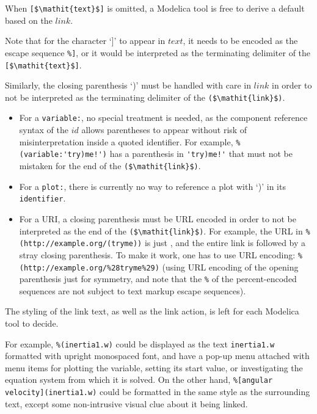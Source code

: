 When \lstinline![$\mathit{text}$]! is omitted, a Modelica tool is free to derive a default based on the $\mathit{link}$.

\begin{nonnormative}
Note that for the character `]' to appear in $\mathit{text}$, it needs to be encoded as the escape sequence \lstinline!%]!, or it would be interpreted as the terminating delimiter of the \lstinline![$\mathit{text}$]!.

Similarly, the closing parenthesis `)' must be handled with care in $\mathit{link}$ in order to not be interpreted as the terminating delimiter of the \lstinline!($\mathit{link}$)!.
\begin{itemize}
\item
For a \lstinline!variable:!, no special treatment is needed, as the component reference syntax of the $\mathit{id}$ allows parentheses to appear without risk of misinterpretation inside a quoted identifier.
For example, \lstinline"%(variable:'try)me!')" has a parenthesis in \lstinline"'try)me!'" that must not be mistaken for the end of the \lstinline!($\mathit{link}$)!.
\item
For a \lstinline!plot:!, there is currently no way to reference a plot with `)' in its \lstinline!identifier!.
\item
For a URI, a closing parenthesis must be URL encoded in order to not be interpreted as the end of the \lstinline!($\mathit{link}$)!.
For example, the URL in \lstinline[language={[nocomment]modelica}]!%
To make it work, one has to use URL encoding: \lstinline[language={[nocomment]modelica}]!%
\end{itemize}
\end{nonnormative}

The styling of the link text, as well as the link action, is left for each Modelica
tool to decide.

\begin{nonnormative}
For example, \lstinline!%(inertia1.w)! could be displayed as the text
\lstinline!inertia1.w! formatted with upright monospaced font, and have a pop-up
menu attached with menu items for plotting the variable, setting its start
value, or investigating the equation system from which it is solved.  On the
other hand, \lstinline!%[angular velocity](inertia1.w)! could be formatted in
the same style as the surrounding text, except some non-intrusive visual clue
about it being linked.
\end{nonnormative}

